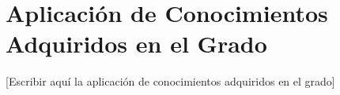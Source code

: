 
\section{Aplicación de Conocimientos Adquiridos en el Grado}

[Escribir aquí la aplicación de conocimientos adquiridos en el grado]
